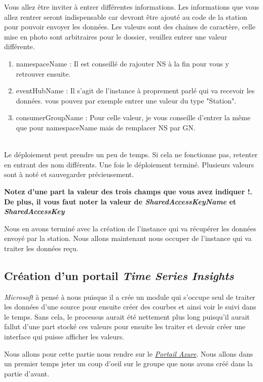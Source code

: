 \begin{enumerate}
Vous allez être inviter à entrer différentes informations. Les informations que vous allez rentrer seront indispensable car devront être ajouté au code de la station pour pouvoir envoyer les données. Les valeurs sont des chaines de caractère, celle mise en photo sont arbitraires pour le dossier, veuillez entrer une valeur différente.
	\begin{enumerate}
		\item namespaceName : Il est conseillé de rajouter NS à la fin pour vous y retrouver ensuite. %
		\item eventHubName : Il s'agit de l'instance à proprement parlé qui va recevoir les données. vous pouvez par exemple entrer une valeur du type "Station".
		\item consumerGroupName : Pour celle valeur, je vous conseille d'entrer la même que pour namespaceName mais de remplacer NS par GN.
	\end{enumerate}\\ 
Le déploiement peut prendre un peu de temps. Si cela ne fonctionne pas, retenter en entrant des nom différents.
Une fois le déploiement terminé. Plusieurs valeurs sont à noté et sauvegarder précieusement.

\textbf{Notez d'une part la valeur des trois champs que vous avez indiquer !.
De plus, il vous faut noter la valeur de \textit{SharedAccessKeyName} et \textit{SharedAccessKey}}

\end{enumerate}

Nous en avons terminé avec la création de l'instance qui va récupérer les données envoyé par la station. Nous allons maintenant nous occuper de l'instance qui va traiter les données reçu.

\subsection{Création d'un portail \textit{Time Series Insights}}

\textit{Microsoft} à pensé à nous puisque il a crée un module qui s'occupe seul de traiter les données d'une source pour ensuite créer des courbes et ainsi voir le suivi dans le temps. Sans cela, le processus aurait été nettement plus long puisqu'il aurait fallut d'une part stocké ces valeurs pour ensuite les traiter et devoir créer une interface qui puisse afficher les valeurs.

Nous allons pour cette partie nous rendre sur le \href{https://portal.azure.com}{\textit{Portail Azure}}. Nous allons dans un premier temps jeter un coup d'oeil sur le groupe que nous avons créé dans la partie d'avant. %
\\

